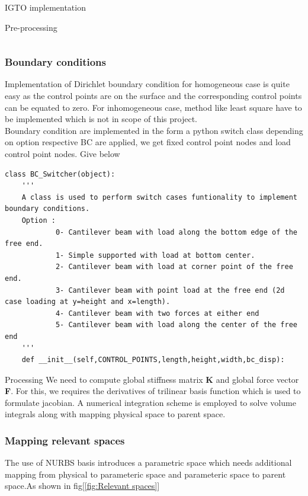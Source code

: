 \documentclass[a4paper,12pt,times]{article}
\begin{document}
\begin{section}{IGTO implementation}
\begin{subsection}{Pre-processing}
\begin{lstlisting}
\end{lstlisting}


\subsubsection{Boundary conditions}
Implementation of Dirichlet boundary condition for homogeneous case is quite easy as the control points are on the surface and the corresponding control points can be equated to zero. For inhomogeneous case, method like least square have to be implemented which is not in scope of this project.\\
Boundary condition are implemented in the form a python switch class depending on option respective BC are applied, we get fixed control point nodes and load control point nodes. Give below 
\begin{lstlisting}
class BC_Switcher(object):
    '''
    A class is used to perform switch cases funtionality to implement boundary conditions.
    Option :
            0- Cantilever beam with load along the bottom edge of the free end.
            1- Simple supported with load at bottom center.
            2- Cantilever beam with load at corner point of the free end.
            3- Cantilever beam with point load at the free end (2d case loading at y=height and x=length).
            4- Cantilever beam with two forces at either end
            5- Cantilever beam with load along the center of the free end
    '''
    def __init__(self,CONTROL_POINTS,length,height,width,bc_disp):

\end{lstlisting}  
\end{subsection}

\begin{subsection}{Processing}
We need to compute global stiffness matrix \textbf{K} and global force vector \textbf{F}. For this, we requires the derivatives of trilinear basis function which is used to formulate jacobian. A numerical integration scheme is employed to solve volume integrals along with mapping physical space to parent space.  

\subsubsection{Mapping relevant spaces}

The use of NURBS basis introduces a parametric space which needs additional mapping from physical to parameteric space and parameteric space to parent space.As shown in fig[\ref{fig:Relevant spaces}]

\end{subsection}
\end{section}
\end{document}
